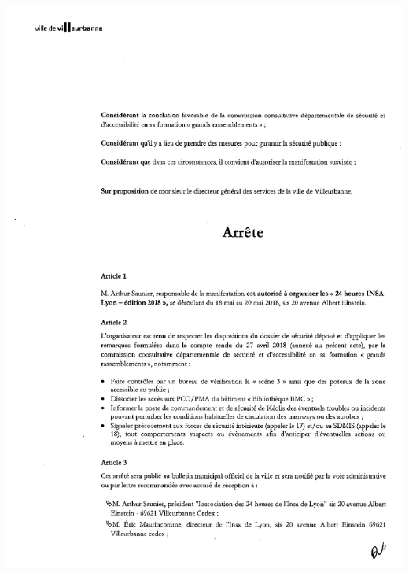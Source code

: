 \documentclass[hidelinks, paper=a4, fontsize=13pt]{report}
\begin{document}
\begin{center}
\includegraphics[scale=0.70]{Annexes/Documents/VilleurbanneGrandRassemblement2}

\end{center}
\end{document}
